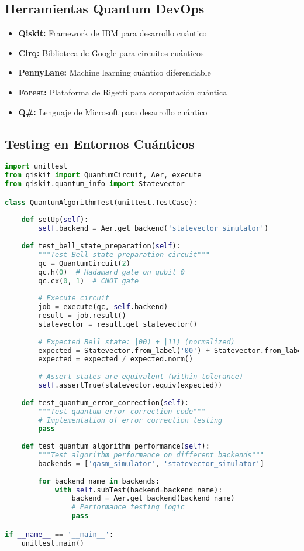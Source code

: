 \documentclass[12pt,a4paper]{article}
\begin{document}
\subsection{Herramientas Quantum DevOps}
\begin{itemize}
    \item \textbf{Qiskit:} Framework de IBM para desarrollo cuántico
    \item \textbf{Cirq:} Biblioteca de Google para circuitos cuánticos
    \item \textbf{PennyLane:} Machine learning cuántico diferenciable
    \item \textbf{Forest:} Plataforma de Rigetti para computación cuántica
    \item \textbf{Q\#:} Lenguaje de Microsoft para desarrollo cuántico
\end{itemize}

\subsection{Testing en Entornos Cuánticos}
\begin{lstlisting}[language=python, caption=Ejemplo de testing cuántico con Qiskit]
import unittest
from qiskit import QuantumCircuit, Aer, execute
from qiskit.quantum_info import Statevector

class QuantumAlgorithmTest(unittest.TestCase):
    
    def setUp(self):
        self.backend = Aer.get_backend('statevector_simulator')
        
    def test_bell_state_preparation(self):
        """Test Bell state preparation circuit"""
        qc = QuantumCircuit(2)
        qc.h(0)  # Hadamard gate on qubit 0
        qc.cx(0, 1)  # CNOT gate
        
        # Execute circuit
        job = execute(qc, self.backend)
        result = job.result()
        statevector = result.get_statevector()
        
        # Expected Bell state: |00⟩ + |11⟩ (normalized)
        expected = Statevector.from_label('00') + Statevector.from_label('11')
        expected = expected / expected.norm()
        
        # Assert states are equivalent (within tolerance)
        self.assertTrue(statevector.equiv(expected))
        
    def test_quantum_error_correction(self):
        """Test quantum error correction code"""
        # Implementation of error correction testing
        pass
        
    def test_quantum_algorithm_performance(self):
        """Test algorithm performance on different backends"""
        backends = ['qasm_simulator', 'statevector_simulator']
        
        for backend_name in backends:
            with self.subTest(backend=backend_name):
                backend = Aer.get_backend(backend_name)
                # Performance testing logic
                pass

if __name__ == '__main__':
    unittest.main()
\end{lstlisting}
\end{document}

